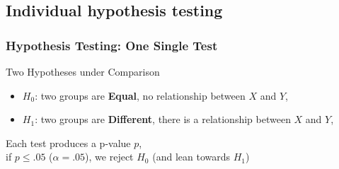 \documentclass[xcolor={pdftex,dvipsnames,table}]{beamer}
\newcommand{\rbf}[1]{\textcolor{redUnipd}{ #1}}
\begin{document}
\subsection{Individual hypothesis testing}
\begin{frame}
\frametitle{Hypothesis Testing: One Single Test}

\rbf{Two Hypotheses under Comparison}

\begin{itemize}
\item $H_0$: two groups are \textbf{Equal}, no relationship between $X$ and $Y$, 
\item $H_1$: two groups are \textbf{Different}, there is a relationship between $X$ and $Y$,
\end{itemize}

\bigskip

Each test produces a p-value $p$, \\  if $p\leq .05$ ($\alpha=.05$), we reject $H_0$ (and lean towards $H_1$)
\end{frame}
\end{document}
